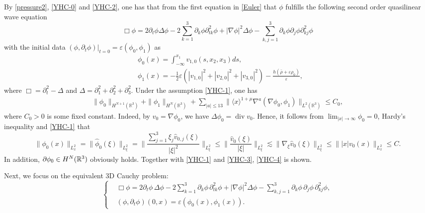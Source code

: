 \documentclass[11pt,twoside]{article}
\def\na{\nabla}
\def\ds{\displaystyle}
\def\f{\frac}
\def\p{\partial}
\def\ve{\varepsilon}
\def\ls{\lesssim}
\DeclareMathOperator{\Div}{div}
\theoremstyle{plain}
\theoremstyle{definition}
\theoremstyle{assumption}
\numberwithin{equation}{section}
\begin{document}
By \eqref{pressure2}, \eqref{YHC-0} and \eqref{YHC-2}, one has that from the first equation in \eqref{Euler}
that $\phi$ fulfills the following second order quasilinear wave equation
	\begin{equation}\label{potentia1}
		\Box\phi=2\p_t\phi\Delta\phi-2\sum_{k=1}^3\p_k\phi\p_{tk}^2\phi
		+|\nabla\phi|^2\Delta\phi-\sum_{k,j=1}^3\p_k\phi\p_j\phi\p_{kj}^2\phi
	\end{equation}
with the initial data $(\phi,\p_t\phi)|_{t=0}=\ve(\phi_0,\phi_1)$ as
\begin{equation}\label{YHC-3}
\begin{split}
&\phi_{0}(x)=\int_{-\infty}^{x_1}v_{1,0}(s,x_2,x_3)ds,\\
&\phi_{1}(x)=-\frac12\ve(|v_{1,0}|^2+|v_{2,0}|^2+|v_{3,0}|^2)-\f{h(\bar\rho+\ve\rho_0)}{\ve},
\end{split}
\end{equation}
where $\Box=\p_t^2-\Delta$ and $\Delta=\p_1^2+\p_2^2+\p_3^2$. Under the assumption \eqref{YHC-1}, one has
\begin{equation}\label{YHC-4}
\begin{split}
\|\phi_0\|_{H^{N+1}(\mathbb{R}^3)}+\|\phi_1\|_{H^{N}(\mathbb{R}^3)} + \sum_{|a|\le 13} \|\langle x\rangle^{1+\mu} \nabla^a(\na\phi_0,\phi_1)\|_{L^2(\mathbb{R}^3)} \le C_0,
\end{split}
\end{equation}
where $C_0>0$ is some fixed constant. Indeed, by $v_0=\nabla\phi_0$, we have
$\Delta \phi_0=\Div v_0$. Hence, it follows from $\ds\lim_{|x|\to\infty}\phi_0=0$,
Hardy's inequality and \eqref{YHC-1} that
$$\|\phi_0(x)\|_{L_x^2}=\|\hat\phi_0(\xi)\|_{L_{\xi}^2}=\bigg\|\ds\frac{\sum_{j=1}^3\xi_j\hat v_{0,j}(\xi)}{|\xi|^2}\bigg\|_{L^2_{\xi}}
\le\bigg\|\f{\hat v_0(\xi)}{|\xi|}\bigg\|_{L^2_{\xi}}\ls \|\nabla_{\xi}\hat v_0(\xi)\|_{L^2_{\xi}}\le\||x|v_0(x)\|_{L_x^2}\le C.$$
In addition, $\p\phi_0\in H^{N}(\Bbb R^3)$ obviously holds. Together with \eqref{YHC-1} and \eqref{YHC-3}, \eqref{YHC-4} is shown.
	
Next, we focus on the equivalent 3D Cauchy problem:
\begin{equation}\label{eq:Chaplygin-Cauchy}
\left\{
\begin{aligned}
&\Box\phi=2\partial_t\phi\,\Delta\phi-
2\sum_{k=1}^3\partial_k\phi\,\partial^2_{tk}\phi+
|\nabla\phi|^2\Delta\phi-\sum_{k,j=1}^3\partial_k\phi\,\partial_j\phi\,\partial^2_{kj}\phi,\\
&(\phi, \partial_t\phi)(0,x)=\ve(\phi_0(x),\phi_1(x)).
\end{aligned}
\right.
\end{equation}
	
\end{document}
